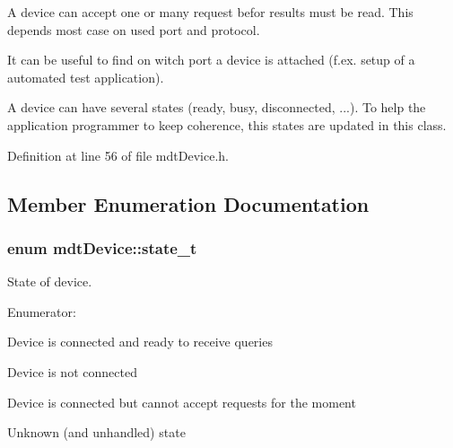 A device can accept one or many request befor results must be read. This depends most case on used port and protocol.

It can be useful to find on witch port a device is attached (f.ex. setup of a automated test application).

A device can have several states (ready, busy, disconnected, ...). To help the application programmer to keep coherence, this states are updated in this class. 

Definition at line 56 of file mdtDevice.h.



\subsection{Member Enumeration Documentation}
\hypertarget{classmdt_device_a39c301b1fda803dba0c9ab98164a9d1e}{
\subsubsection[{state\_\-t}]{\setlength{\rightskip}{0pt plus 5cm}enum {\bf mdtDevice::state\_\-t}}}
\label{classmdt_device_a39c301b1fda803dba0c9ab98164a9d1e}


State of device. 

\begin{Desc}
\item[Enumerator: ]\par
\begin{description}
\item[{\em 
\hypertarget{classmdt_device_a39c301b1fda803dba0c9ab98164a9d1ea577f509c27c399a211c5dc18c0235b69}{
Ready}
\label{classmdt_device_a39c301b1fda803dba0c9ab98164a9d1ea577f509c27c399a211c5dc18c0235b69}
}]Device is connected and ready to receive queries \item[{\em 
\hypertarget{classmdt_device_a39c301b1fda803dba0c9ab98164a9d1eae06fa1b4e5872df7470aeed0878a2947}{
Disconnected}
\label{classmdt_device_a39c301b1fda803dba0c9ab98164a9d1eae06fa1b4e5872df7470aeed0878a2947}
}]Device is not connected \item[{\em 
\hypertarget{classmdt_device_a39c301b1fda803dba0c9ab98164a9d1ea4a064f3dc9a486991b3ec09127b1c42a}{
Busy}
\label{classmdt_device_a39c301b1fda803dba0c9ab98164a9d1ea4a064f3dc9a486991b3ec09127b1c42a}
}]Device is connected but cannot accept requests for the moment \item[{\em 
\hypertarget{classmdt_device_a39c301b1fda803dba0c9ab98164a9d1ea9e9410b52d18a2c4da60748530709f09}{
Unknown}
\label{classmdt_device_a39c301b1fda803dba0c9ab98164a9d1ea9e9410b52d18a2c4da60748530709f09}
}]Unknown (and unhandled) state \end{description}
\end{Desc}



